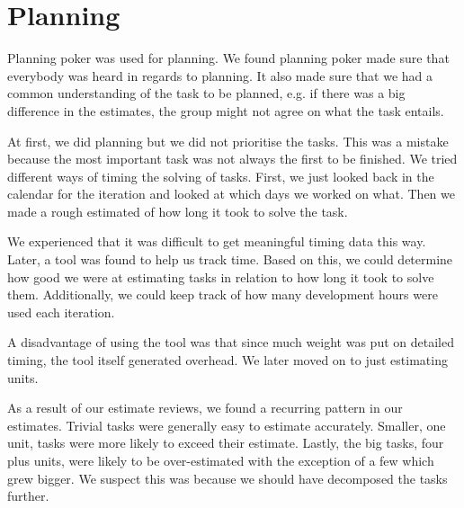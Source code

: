 \section{Planning}
Planning poker was used for planning. We found planning poker made sure that everybody was heard in regards to planning. It also made sure that we had a common understanding of the task to be planned, e.g. if there was a big difference in the estimates, the group might not agree on what the task entails.

At first, we did planning but we did not prioritise the tasks. This was a mistake because the most important task was not always the first to be finished. We tried different ways of timing the solving of tasks. First, we just looked back in the calendar for the iteration and looked at which days we worked on what. Then we made a rough estimated of how long it took to solve the task. 

We experienced that it was difficult to get meaningful timing data this way. Later, a tool was found to help us track time. Based on this, we could determine how good we were at estimating tasks in relation to how long it took to solve them. Additionally, we could keep track of how many development hours were used each iteration. 

A disadvantage of using the tool was that since much weight was put on detailed timing, the tool itself generated overhead. We later moved on to just estimating units.

As a result of our estimate reviews, we found a recurring pattern in our estimates. Trivial tasks were generally easy to estimate accurately. Smaller, one unit, tasks were more likely to exceed their estimate. Lastly, the big tasks, four plus units, were likely to be over-estimated with the exception of a few which grew bigger. We suspect this was because we should have decomposed the tasks further.